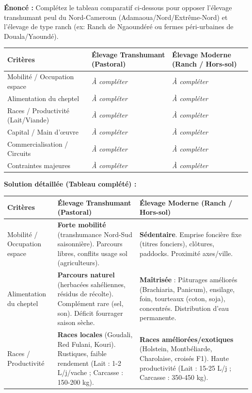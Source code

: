\documentclass[11pt]{article}
\begin{document}
\begin{exoresolu}
\textbf{Énoncé :} Complétez le tableau comparatif ci-dessous pour opposer l'élevage transhumant peul du Nord-Cameroun (Adamaoua/Nord/Extrême-Nord) et l'élevage de type ranch (ex: Ranch de Ngaoundéré ou fermes péri-urbaines de Douala/Yaoundé).
\begin{center}
\begin{tabularx}{\linewidth}{|l|X|X|}\hline
\rowcolor{popblueL} \textbf{Critères} & \textbf{Élevage Transhumant (Pastoral)} & \textbf{Élevage Moderne (Ranch / Hors-sol)} \\ \hline
Mobilité / Occupation espace & \textit{À compléter} & \textit{À compléter} \\ \hline
Alimentation du cheptel & \textit{À compléter} & \textit{À compléter} \\ \hline
Races / Productivité (Lait/Viande) & \textit{À compléter} & \textit{À compléter} \\ \hline
Capital / Main d'œuvre & \textit{À compléter} & \textit{À compléter} \\ \hline
Commercialisation / Circuits & \textit{À compléter} & \textit{À compléter} \\ \hline
Contraintes majeures & \textit{À compléter} & \textit{À compléter} \\ \hline
\end{tabularx}
\end{center}
\tcblower
\textbf{Solution détaillée (Tableau complété) :}
\begin{center}
\begin{tabularx}{\linewidth}{|l|X|X|}\hline
\rowcolor{popblueL} \textbf{Critères} & \textbf{Élevage Transhumant (Pastoral)} & \textbf{Élevage Moderne (Ranch / Hors-sol)} \\ \hline
Mobilité / Occupation espace & \textbf{Forte mobilité} (transhumance Nord-Sud saisonnière). Parcours libres, conflits usage sol (agriculteurs). & \textbf{Sédentaire}. Emprise foncière fixe (titres fonciers), clôtures, paddocks. Proximité axes/ville. \\ \hline
Alimentation du cheptel & \textbf{Parcours naturel} (herbacées sahéliennes, résidus de récolte). Complément rare (sel, son). Déficit fourrager saison sèche. & \textbf{Maîtrisée} : Pâturages améliorés (Brachiaria, Panicum), ensilage, foin, tourteaux (coton, soja), concentrés. Distribution d'eau permanente. \\ \hline
Races / Productivité & \textbf{Races locales} (Goudali, Red Fulani, Kouri). Rustiques, faible rendement (Lait : 1-2 L/j/vache ; Carcasse : 150-200 kg). & \textbf{Races améliorées/exotiques} (Holstein, Montbéliarde, Charolaise, croisés F1). Haute productivité (Lait : 15-25 L/j ; Carcasse : 350-450 kg). \\ \hline

\end{tabularx}
\end{center}
\end{exoresolu}
\end{document}

